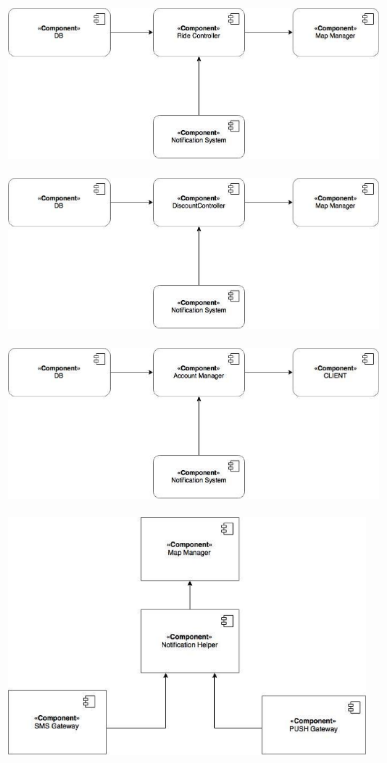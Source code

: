 \begin{figure}[H]
	\centering
	\includegraphics[height=4cm,keepaspectratio]{figures/itp5.eps}
	\label{fig:itp5}
\end{figure}

\begin{figure}[H]
	\centering
	\includegraphics[height=4cm,keepaspectratio]{figures/itp7.eps}
	\label{fig:itp7}
\end{figure}

\begin{figure}[H]
	\centering
	\includegraphics[height=4cm,keepaspectratio]{figures/itp8.eps}
	\label{fig:itp8}
\end{figure}

\begin{figure}[H]
	\centering
	\includegraphics[height=6.285cm,keepaspectratio]{figures/components_notification.eps}
	\label{fig:components_notification}
\end{figure}

